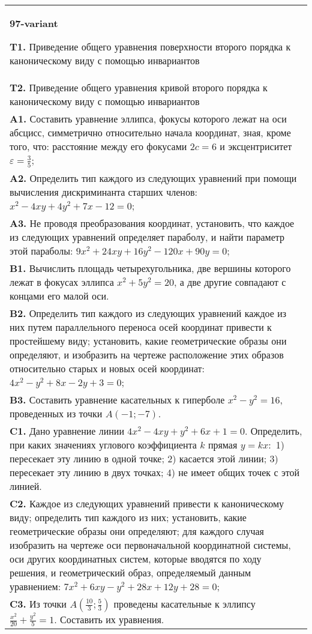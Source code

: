 \documentclass{article}
\begin{document}
\begin{tabular}{m{17cm}}
\textbf{97-variant}
\newline

\textbf{T1.} Приведение общего уравнения поверхности второго порядка к каноническому виду с помощью инвариантов \\
\textbf{T2.} Приведение общего уравнения кривой второго порядка к каноническому виду с помощью инвариантов \\
\textbf{A1.} Составить уравнение эллипса, фокусы которого лежат на оси абсцисс, симметрично относительно начала координат, зная, кроме того, что: расстояние между его фокусами $2 c=6$ и эксцентриситет $\varepsilon=\frac{3}{5}$; \\
\textbf{A2.} Определить тип каждого из следующих уравнений при помощи вычисления дискриминанта старших членов: $x^2-4 x y+4 y^2+7 x-12=0$; \\
\textbf{A3.} Не проводя преобразования координат, установить, что каждое из следующих уравнений определяет параболу, и найти параметр этой параболы: $9 x^2+24 x y+16 y^2-120 x+90 y=0$; \\
\textbf{B1.} Вычислить площадь четырехугольника, две вершины которого лежат в фокусах эллипса $x^2+5 y^2=20$, а две другие совпадают с концами его малой оси. \\
\textbf{B2.} Определить тип каждого из следующих уравнений каждое из них путем параллельного переноса осей координат привести к простейшему виду; установить, какие геометрические образы они определяют, и изобразить на чертеже расположение этих образов относительно старых и новых осей координат: $4 x^2-y^2+8 x-2 y+3=0$; \\
\textbf{B3.} Составить уравнение касательных к гиперболе $x^2-y^2=16$, проведенных из точки $A(-1 ;-7)$. \\
\textbf{C1.} Дано уравнение линии $4 x^2-4 x y+y^2+6 x+1=0$. Определить, при каких значениях углового коэффициента $k$ прямая $y=k x:$ 1) пересекает эту линию в одной точке; 2) касается этой линии; 3) пересекает эту линию в двух точках; 4) не имеет общих точек с этой линией. \\
\textbf{C2.} Каждое из следующих уравнений привести к каноническому виду; определить тип каждого из них; установить, какие геометрические образы они определяют; для каждого случая изобразить на чертеже оси первоначальной координатной системы, оси других координатных систем, которые вводятся по ходу решения, и геометрический образ, определяемый данным уравнением: $7 x^2+6 x y-y^2+28 x+12 y+28=0$; \\
\textbf{C3.} Из точки $A\left(\frac{10}{3} ; \frac{5}{3}\right)$ проведены касательные к эллипсу $\frac{x^2}{20}+\frac{y^2}{5}=1$. Составить их уравнения. \\

\end{tabular}
\vspace{1cm}
\end{document}
